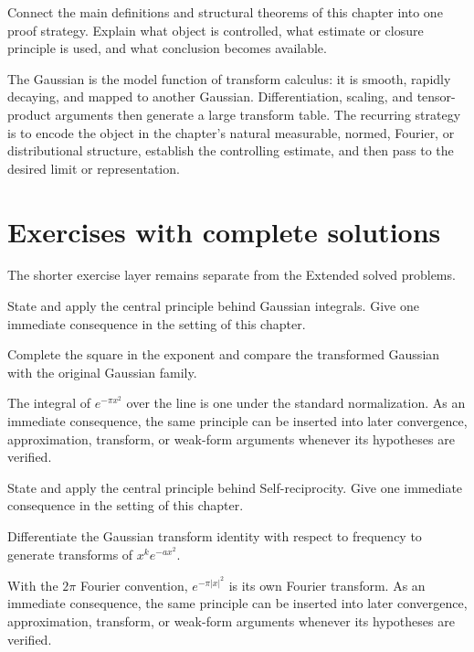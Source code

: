 \begin{problem}\label{prob:iii12-problem-12}
Connect the main definitions and structural theorems of this chapter into one proof strategy. Explain what object is controlled, what estimate or closure principle is used, and what conclusion becomes available.
\end{problem}
\begin{solution}
The Gaussian is the model function of transform calculus: it is smooth, rapidly decaying, and mapped to another Gaussian. Differentiation, scaling, and tensor-product arguments then generate a large transform table. The recurring strategy is to encode the object in the chapter's natural measurable, normed, Fourier, or distributional structure, establish the controlling estimate, and then pass to the desired limit or representation.
\end{solution}
\section{Exercises with complete solutions}
The shorter exercise layer remains separate from the Extended solved problems.

\begin{exercise}\label{exr:iii12-01}
State and apply the central principle behind Gaussian integrals. Give one immediate consequence in the setting of this chapter.
\end{exercise}
\begin{hint}
Complete the square in the exponent and compare the transformed Gaussian with the original Gaussian family.
\end{hint}
\begin{solution}
The integral of $e^{-\pi x^2}$ over the line is one under the standard normalization. As an immediate consequence, the same principle can be inserted into later convergence, approximation, transform, or weak-form arguments whenever its hypotheses are verified.
\end{solution}

\begin{exercise}\label{exr:iii12-02}
State and apply the central principle behind Self-reciprocity. Give one immediate consequence in the setting of this chapter.
\end{exercise}
\begin{hint}
Differentiate the Gaussian transform identity with respect to frequency to generate transforms of \(x^k e^{-ax^2}\).
\end{hint}
\begin{solution}
With the $2\pi$ Fourier convention, $e^{-\pi|x|^2}$ is its own Fourier transform. As an immediate consequence, the same principle can be inserted into later convergence, approximation, transform, or weak-form arguments whenever its hypotheses are verified.
\end{solution}

